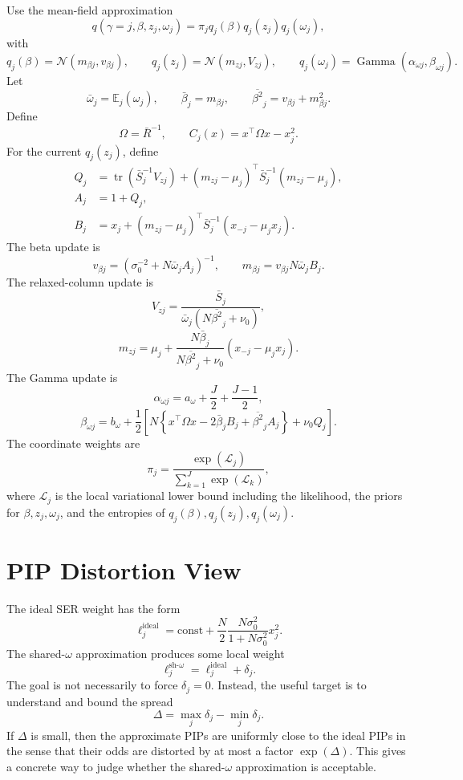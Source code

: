 \documentclass[11pt]{article}
\newcommand{\Rbar}{\bar R}
\newcommand{\Om}{\Omega}
\newcommand{\E}{\mathbb E}
\newcommand{\tr}{\operatorname{tr}}
\newcommand{\Normal}{\mathcal N}
\newcommand{\Gam}{\operatorname{Gamma}}
\begin{document}
Use the mean-field approximation
\[
q(\gamma=j,\beta,z_j,\omega_j)
=
\pi_jq_j(\beta)q_j(z_j)q_j(\omega_j),
\]
with
\[
q_j(\beta)=\Normal(m_{\beta j},v_{\beta j}),
\qquad
q_j(z_j)=\Normal(m_{zj},V_{zj}),
\qquad
q_j(\omega_j)=\Gam(\alpha_{\omega j},\beta_{\omega j}).
\]
Let
\[
\bar\omega_j=\E_j(\omega_j),
\qquad
\bar\beta_j=m_{\beta j},
\qquad
\overline{\beta^2}_j=v_{\beta j}+m_{\beta j}^2.
\]
Define
\[
\Om=\Rbar^{-1},
\qquad
C_j(x)=x^\top\Om x-x_j^2.
\]
For the current \(q_j(z_j)\), define
\begin{align*}
Q_j
&=
\tr(\bar S_j^{-1}V_{zj})
+(m_{zj}-\mu_j)^\top\bar S_j^{-1}(m_{zj}-\mu_j),\\
A_j&=1+Q_j,\\
B_j
&=
x_j+(m_{zj}-\mu_j)^\top\bar S_j^{-1}
(x_{-j}-\mu_jx_j).
\end{align*}
The beta update is
\[
v_{\beta j}
=
\left(\sigma_0^{-2}+N\bar\omega_jA_j\right)^{-1},
\qquad
m_{\beta j}
=
v_{\beta j}N\bar\omega_jB_j.
\]
The relaxed-column update is
\[
V_{zj}
=
\frac{\bar S_j}
{\bar\omega_j(N\overline{\beta^2}_j+\nu_0)},
\]
\[
m_{zj}
=
\mu_j+
\frac{N\bar\beta_j}
{N\overline{\beta^2}_j+\nu_0}
(x_{-j}-\mu_jx_j).
\]
The Gamma update is
\[
\alpha_{\omega j}
=
a_\omega+\frac{J}{2}+\frac{J-1}{2},
\]
\[
\beta_{\omega j}
=
b_\omega
+\frac12
\left[
N\left\{
x^\top\Om x-2\bar\beta_jB_j+\overline{\beta^2}_jA_j
\right\}
+\nu_0Q_j
\right].
\]
The coordinate weights are
\[
\pi_j
=
\frac{\exp(\mathcal L_j)}
{\sum_{k=1}^J\exp(\mathcal L_k)},
\]
where \(\mathcal L_j\) is the local variational lower bound including the
likelihood, the priors for \(\beta,z_j,\omega_j\), and the entropies of
\(q_j(\beta),q_j(z_j),q_j(\omega_j)\).

\section{PIP Distortion View}

The ideal SER weight has the form
\[
\ell_j^{\mathrm{ideal}}
=
\mathrm{const}
+
\frac{N}{2}
\frac{N\sigma_0^2}{1+N\sigma_0^2}
x_j^2.
\]
The shared-\(\omega\) approximation produces some local weight
\[
\ell_j^{\mathrm{sh}\text{-}\omega}
=
\ell_j^{\mathrm{ideal}}+\delta_j.
\]
The goal is not necessarily to force \(\delta_j=0\). Instead, the useful target
is to understand and bound the spread
\[
\Delta
=
\max_j\delta_j-\min_j\delta_j.
\]
If \(\Delta\) is small, then the approximate PIPs are uniformly close to the
ideal PIPs in the sense that their odds are distorted by at most a factor
\(\exp(\Delta)\). This gives a concrete way to judge whether the
shared-\(\omega\) approximation is acceptable.
\end{document}
